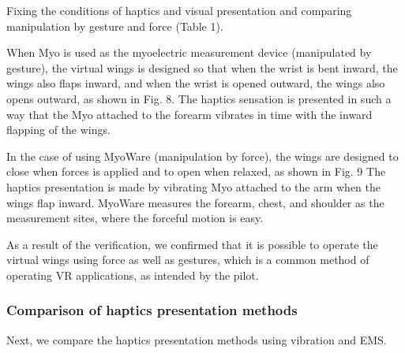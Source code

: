 \documentclass[letterpaper, 10 pt, conference]{ieeeconf}  %
\begin{document}
                        Fixing the conditions of haptics and visual presentation and comparing manipulation by gesture and force (Table 1).

                
                        When Myo is used as the myoelectric measurement device (manipulated by gesture), the virtual wings is designed so that when the wrist is bent inward, the wings also flaps inward, and when the wrist is opened outward, the wings also opens outward, as shown in Fig. 8.  
                        The haptics sensation is presented in such a way that the Myo attached to the forearm vibrates in time with the inward flapping of the wings.  

                        In the case of using MyoWare (manipulation by force), the wings are designed to close when forces is applied and to open when relaxed, as shown in Fig. 9  
                        The haptics presentation is made by vibrating Myo attached to the arm when the wings flap inward.  
                        MyoWare measures the forearm, chest, and shoulder as the measurement sites, where the forceful motion is easy.  

                        As a result of the verification, we confirmed that it is possible to operate the virtual wings using force as well as gestures, which is a common method of operating VR applications, as intended by the pilot.  


                \subsubsection{Comparison of haptics presentation methods}
                        Next, we compare the haptics presentation methods using vibration and EMS.  

                        
\end{document}
